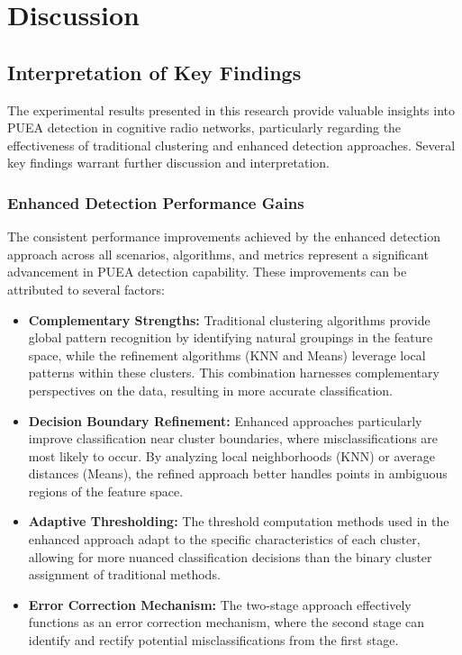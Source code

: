 \chapter{Discussion}

\section{Interpretation of Key Findings}

The experimental results presented in this research provide valuable insights into PUEA detection in cognitive radio networks, particularly regarding the effectiveness of traditional clustering and enhanced detection approaches. Several key findings warrant further discussion and interpretation.

\subsection{Enhanced Detection Performance Gains}

The consistent performance improvements achieved by the enhanced detection approach across all scenarios, algorithms, and metrics represent a significant advancement in PUEA detection capability. These improvements can be attributed to several factors:

\begin{itemize}
    \item \textbf{Complementary Strengths:} Traditional clustering algorithms provide global pattern recognition by identifying natural groupings in the feature space, while the refinement algorithms (KNN and Means) leverage local patterns within these clusters. This combination harnesses complementary perspectives on the data, resulting in more accurate classification.
    
    \item \textbf{Decision Boundary Refinement:} Enhanced approaches particularly improve classification near cluster boundaries, where misclassifications are most likely to occur. By analyzing local neighborhoods (KNN) or average distances (Means), the refined approach better handles points in ambiguous regions of the feature space.
    
    \item \textbf{Adaptive Thresholding:} The threshold computation methods used in the enhanced approach adapt to the specific characteristics of each cluster, allowing for more nuanced classification decisions than the binary cluster assignment of traditional methods.
    
    \item \textbf{Error Correction Mechanism:} The two-stage approach effectively functions as an error correction mechanism, where the second stage can identify and rectify potential misclassifications from the first stage.
\end{itemize}


